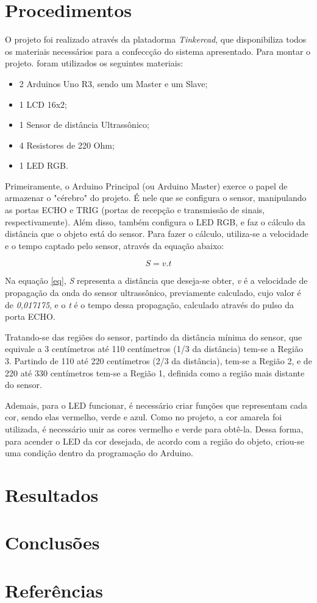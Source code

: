 \documentclass[conference]{IEEEtran}
\begin{document}
\section{Procedimentos}

    O projeto foi realizado através da platadorma \emph{Tinkercad}, que disponibiliza todos os materiais
necessários para a confeccção do sistema apresentado. Para montar o projeto. foram utilizados os seguintes
materiais:
    \begin{itemize}
        \item 2 Arduinos Uno R3, sendo um Master e um Slave;
        \item 1 LCD 16x2;
        \item 1 Sensor de distância Ultrassônico;
        \item 4 Resistores de 220 Ohm;
        \item 1 LED RGB.
    \end{itemize}

    Primeiramente, o Arduino Principal (ou Arduino Master) exerce o papel de armazenar o "cérebro" do 
projeto. É nele que se configura o sensor, manipulando as portas ECHO e TRIG (portas de recepção e 
transmissão de sinais, respectivamente). Além disso, também configura o LED RGB, e faz o cálculo da 
distância que o objeto está do sensor. Para fazer o cálculo, utiliza-se a velocidade e o tempo captado 
pelo sensor, através da equação abaixo:

    \begin{equation}
        S=v.t \label{eq}
    \end{equation}

    Na equação \eqref{eq}, \emph{S} representa a distância que deseja-se obter, \emph{v} é a velocidade
de propagação da onda do sensor ultrassônico, previamente calculado, cujo valor é de \emph{0,017175}, e
o \emph{t} é o tempo dessa propagação, calculado através do pulso da porta ECHO.

    Tratando-se das regiões do sensor,  partindo da distância mínima do sensor, que equivale a
3 centímetros até 110 centímetros (1/3 da distância) tem-se a Região 3. Partindo de 110 até 220 
centímetros (2/3 da distância), tem-se a Região 2, e de 220 até 330 centímetros	tem-se a Região 1,
definida como a região mais distante do sensor.

    Ademais, para o LED funcionar, é necessário criar funções que representam cada cor, sendo elas 
vermelho, verde e azul. Como no projeto, a cor amarela foi utilizada, é necessário unir as cores vermelho
e verde para obtê-la. Dessa forma, para acender o LED da cor desejada, de acordo com a região do objeto,
criou-se uma condição dentro da programação do Arduino.

\section{Resultados}


\section{Conclusões}

\section{Referências}
\end{document}
